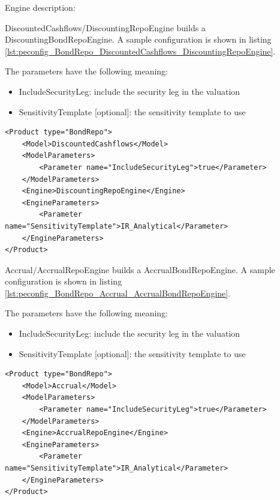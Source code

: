 Engine description:

DiscountedCashflows/DiscountingRepoEngine builds a DiscountingBondRepoEngine. A sample configuration is shown in listing
\ref{lst:peconfig_BondRepo_DiscountedCashflows_DiscountingRepoEngine}.

The parameters have the following meaning:

\begin{itemize}
\item IncludeSecurityLeg: include the security leg in the valuation
\item SensitivityTemplate [optional]: the sensitivity template to use
\end{itemize}

\begin{longlisting}
\begin{verbatim}
<Product type="BondRepo">
    <Model>DiscountedCashflows</Model>
    <ModelParameters>
        <Parameter name="IncludeSecurityLeg">true</Parameter>
    </ModelParameters>
    <Engine>DiscountingRepoEngine</Engine>
    <EngineParameters>
        <Parameter name="SensitivityTemplate">IR_Analytical</Parameter>
    </EngineParameters>
</Product>
\end{verbatim}
\caption{Configuration for Product BondRepo, Model DiscountedCashflows, Engine DiscountingRepoEngine}
\label{lst:peconfig_BondRepo_DiscountedCashflows_DiscountingRepoEngine}
\end{longlisting}

Accrual/AccrualRepoEngine builds a AccrualBondRepoEngine. A sample configuration is shown in listing
\ref{lst:peconfig_BondRepo_Accrual_AccrualBondRepoEngine}.

The parameters have the following meaning:

\begin{itemize}
\item IncludeSecurityLeg: include the security leg in the valuation
\item SensitivityTemplate [optional]: the sensitivity template to use
\end{itemize}

\begin{longlisting}
\begin{verbatim}
<Product type="BondRepo">
    <Model>Accrual</Model>
    <ModelParameters>
        <Parameter name="IncludeSecurityLeg">true</Parameter>
    </ModelParameters>
    <Engine>AccrualRepoEngine</Engine>
    <EngineParameters>
        <Parameter name="SensitivityTemplate">IR_Analytical</Parameter>
    </EngineParameters>
</Product>
\end{verbatim}
\caption{Configuration for Product BondRepo, Model Accrual, Engine DiscountingBondRepoEngine}
\label{lst:peconfig_BondRepo_Accrual_AccrualBondRepoEngine}
\end{longlisting}

